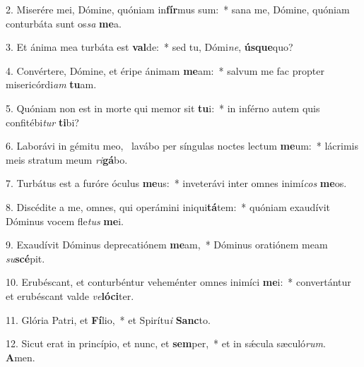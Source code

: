 2. Miserére mei, Dómine, quóniam in\textbf{fír}mus sum:~*  sana me, Dómine, quóniam conturbáta sunt os\textit{sa} \textbf{me}a.\

3. Et ánima mea turbáta est \textbf{val}de:~*  sed tu, Dómi\textit{ne}, \textbf{ús}\textbf{que}quo?\

4. Convértere, Dómine, et éripe ánimam \textbf{me}am:~*  salvum me fac propter misericórdi\textit{am} \textbf{tu}am.\

5. Quóniam non est in morte qui memor sit \textbf{tu}i:~*  in inférno autem quis confitébi\textit{tur} \textbf{ti}bi?\

6. Laborávi in gémitu meo, \dag\  lavábo per síngulas noctes lectum \textbf{me}um:~*  lácrimis meis stratum meum \textit{ri}\textbf{gá}bo.\

7. Turbátus est a furóre óculus \textbf{me}us:~*  inveterávi inter omnes inimí\textit{cos} \textbf{me}os.\

8. Discédite a me, omnes, qui operámini iniqui\textbf{tá}tem:~*  quóniam exaudívit Dóminus vocem fle\textit{tus} \textbf{me}i.\

9. Exaudívit Dóminus deprecatiónem \textbf{me}am,~*  Dóminus oratiónem meam \textit{su}\textbf{scé}pit.\

10. Erubéscant, et conturbéntur veheménter omnes inimíci \textbf{me}i:~*  convertántur et erubéscant valde \textit{ve}\textbf{ló}\textbf{ci}ter.\

11. Glória Patri, et \textbf{Fí}lio,~*  et Spirítu\textit{i} \textbf{Sanc}to.\

12. Sicut erat in princípio, et nunc, et \textbf{sem}per,~*  et in sǽcula sæculó\textit{rum}. \textbf{A}men.\


